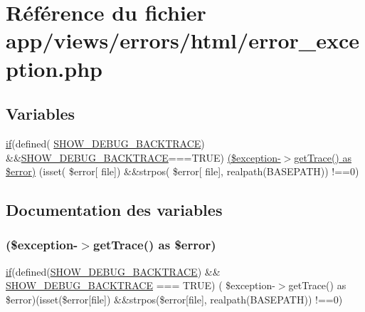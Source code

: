 \hypertarget{html_2error__exception_8php}{}\section{Référence du fichier app/views/errors/html/error\+\_\+exception.php}
\label{html_2error__exception_8php}
\subsection*{Variables}
\begin{DoxyCompactItemize}
\item 
\hyperlink{_v__menu_8php_ac81b1d41ce3949361fdb64fac6891d95}{if}(defined( \textquotesingle{}\hyperlink{constants_8php_a7e2dd6fea73799257285946411aeb5ce}{S\+H\+O\+W\+\_\+\+D\+E\+B\+U\+G\+\_\+\+B\+A\+C\+K\+T\+R\+A\+CE}\textquotesingle{}) \&\&\hyperlink{constants_8php_a7e2dd6fea73799257285946411aeb5ce}{S\+H\+O\+W\+\_\+\+D\+E\+B\+U\+G\+\_\+\+B\+A\+C\+K\+T\+R\+A\+CE}===T\+R\+UE) \hyperlink{html_2error__exception_8php_a4baaf90ce01e99d4aaeb31d010ddc15a}{(\$exception-\/$>$get\+Trace() as \$error)} (isset( \$error\mbox{[} \textquotesingle{}file\textquotesingle{}\mbox{]}) \&\&strpos( \$error\mbox{[} \textquotesingle{}file\textquotesingle{}\mbox{]}, realpath(B\+A\+S\+E\+P\+A\+TH)) !==0)
\end{DoxyCompactItemize}


\subsection{Documentation des variables}
\mbox{\label{html_2error__exception_8php_a4baaf90ce01e99d4aaeb31d010ddc15a}} 
\subsubsection{\texorpdfstring{(\$exception-\/$>$get\+Trace() as \$error)}{($exception->getTrace() as $error)}}
{\footnotesize\ttfamily \hyperlink{_v__menu_8php_ac81b1d41ce3949361fdb64fac6891d95}{if}(defined(\textquotesingle{}\hyperlink{constants_8php_a7e2dd6fea73799257285946411aeb5ce}{S\+H\+O\+W\+\_\+\+D\+E\+B\+U\+G\+\_\+\+B\+A\+C\+K\+T\+R\+A\+CE}\textquotesingle{}) \&\& \hyperlink{constants_8php_a7e2dd6fea73799257285946411aeb5ce}{S\+H\+O\+W\+\_\+\+D\+E\+B\+U\+G\+\_\+\+B\+A\+C\+K\+T\+R\+A\+CE} === T\+R\+UE) ( \$exception-\/$>$get\+Trace() as \$error)(isset(\$error\mbox{[}\textquotesingle{}file\textquotesingle{}\mbox{]}) \&\&strpos(\$error\mbox{[}\textquotesingle{}file\textquotesingle{}\mbox{]}, realpath(B\+A\+S\+E\+P\+A\+TH)) !==0)}

